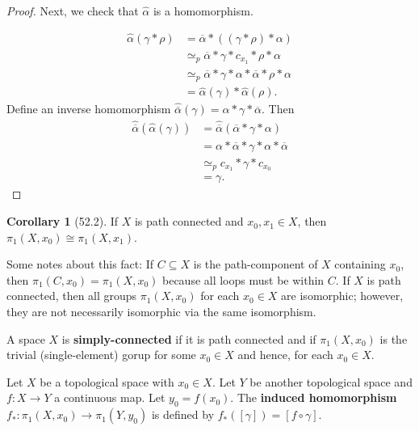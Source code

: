 \documentclass{article}
\newcommand{\nline}{\vspace*{0.5\baselineskip}}
\theoremstyle{definition}
\newtheorem{corollary}{Corollary}[subsection]
\begin{document}
\begin{flushleft}
\begin{proof}
\nline

Next, we check that $\hat{\alpha}$ is a homomorphism.

\[
\begin{align}
    \hat{\alpha}(\gamma * \rho) &= \overline{\alpha}* ((\gamma * \rho) * \alpha) \\
    &\simeq_p \overline{\alpha} * \gamma * c_{x_1} * \rho * \alpha \\
    &\simeq_p \overline{\alpha} * \gamma * \alpha * \overline{\alpha} * \rho * \alpha \\
    &= \hat{\alpha}(\gamma) * \hat{\alpha} (\rho).
\end{align}
\]
Define an inverse homomorphism $\hat{\overline{\alpha}}(\gamma) = \alpha * \gamma * \overline{\alpha}$. Then
\[
\begin{align}
    \hat{\overline{\alpha}}(\hat{\alpha}(\gamma)) &= \hat{\overline{\alpha}}(\overline{\alpha} * \gamma * \alpha) \\
    &= \alpha * \overline{\alpha} * \gamma * \alpha * \overline{\alpha} \\
    &\simeq_p c_{x_1} * \gamma * c_{x_0} \\
    &= \gamma.
\end{align}
\]
\end{proof}

\begin{corollary}[52.2]
If $X$ is path connected and $x_0, x_1 \in X$, then $\pi_1(X, x_0) \cong \pi_1(X, x_1)$.
\end{corollary}

Some notes about this fact: If $C \subseteq X$ is the path-component of $X$ containing $x_0$, then $\pi_1(C, x_0) = \pi_1(X, x_0)$ because all loops must be within $C$. If $X$ is path connected, then all groups $\pi_1(X, x_0)$ for each $x_0 \in X$ are isomorphic; however, they are not necessarily isomorphic via the same isomorphism.

\nline

A space $X$ is \textbf{simply-connected} if it is path connected and if $\pi_1(X, x_0)$ is the trivial (single-element) gorup for some $x_0 \in X$ and hence, for each $x_0 \in X$.

\nline

Let $X$ be a topological space with $x_0 \in X$. Let $Y$ be another topological space and $f : X \to Y$ a continuous map. Let $y_0 = f(x_0)$. The \textbf{induced homomorphism} $f_* : \pi_1(X, x_0) \to \pi_1(Y, y_0)$ is defined by $f_*([\gamma]) = [f \circ \gamma]$.


\end{flushleft}
\end{document}
